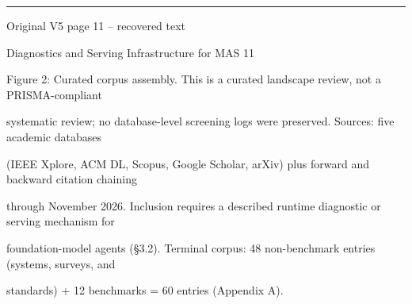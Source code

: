 \par\smallskip\noindent\rule{\textwidth}{0.4pt}\par{\sffamily\footnotesize Original V5 page 11 -- recovered text}\par\begin{flushleft}\footnotesize\ttfamily
\par\smallskip
\par\smallskip
\noindent Diagnostics and Serving Infrastructure for MAS 11\par
\par\smallskip
\par\smallskip
\par\smallskip
\par\smallskip
\noindent Figure 2: Curated corpus assembly. This is a curated landscape review, not a PRISMA-compliant\par
\noindent systematic review; no database-level screening logs were preserved. Sources: five academic databases\par
\noindent (IEEE Xplore, ACM DL, Scopus, Google Scholar, arXiv) plus forward and backward citation chaining\par
\noindent through November 2026. Inclusion requires a described runtime diagnostic or serving mechanism for\par
\noindent foundation-model agents (§3.2). Terminal corpus: 48 non-benchmark entries (systems, surveys, and\par
\noindent standards) + 12 benchmarks = 60 entries (Appendix A).\par
\end{flushleft}
